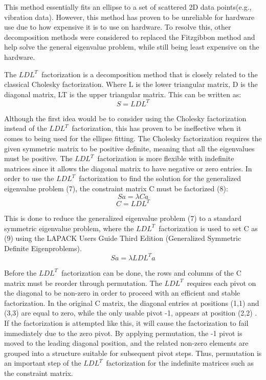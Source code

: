 \documentclass[11pt,a4paper]{article}
\begin{document}
This method essentially fits an ellipse to a set of scattered 2D data points(e.g., vibration data). However, this method has proven to be unreliable for hardware use due to how expensive it is to use on hardware. To resolve this, other decomposition methods were considered to replaced the Fitzgibbon method and help solve the general eigenvalue problem, while still being least expensive on the hardware.  

The $LDL^{T}\,$ factorization is a decomposition method that is closely related to the classical Cholesky factorization. Where L is the lower triangular matrix, D is the diagonal matrix, LT is the upper triangular matrix. This can be written as: 
\begin{equation}
    S = LDL^{T}
\end{equation}

Although the first idea would be to consider using the Cholesky factorization instead of the $LDL^{T}\,$ factorization, this has proven to be ineffective when it comes to being used for the ellipse fitting. The Cholesky factorization requires the given symmetric matrix to be positive definite, meaning that all the eigenvalues must be positive. The $LDL^{T}\,$ factorization is more flexible with indefinite matrices since it allows the diagonal matrix to have negative or zero entries. 
In order to use the $LDL^{T}\,$ factorization  to find the solution for the generalized eigenvalue problem (7), the constraint matrix C must be factorized (8):
\begin{equation}
    Sa = \lambda Ca
\end{equation}
\begin{equation}
    C = LDL^{T}
\end{equation}

This is done to reduce the generalized eigenvalue problem (7) to a standard symmetric eigenvalue problem, where the $LDL^{T}\,$ factorization is used to set C as (9) using the LAPACK Users Guide Third Edition (Generalized Symmetric Definite Eigenproblems).
\begin{equation}
    Sa = \lambda LDL^{T}a
\end{equation}

Before the $LDL^{T}\,$ factorization can be done, the rows and columns of the C matrix must be reorder through permutation. The $LDL^{T}\,$ requires each pivot on the diagonal to be non-zero in order to proceed with an efficient and stable factorization. In the original C matrix, the diagonal entries at positions (1,1) and (3,3) are equal to zero, while the only usable pivot -1, appears at position (2,2) . If the factorization is attempted like this, it will cause the factorization to fail immediately due to the zero pivot. By applying permutation, the -1 pivot is moved to the leading diagonal position, and the related non-zero elements are grouped into a structure suitable for subsequent pivot steps. Thus, permutation is an important step of the $LDL^{T}\,$ factorization for the indefinite matrices such as the constraint matrix. 
\end{document}
